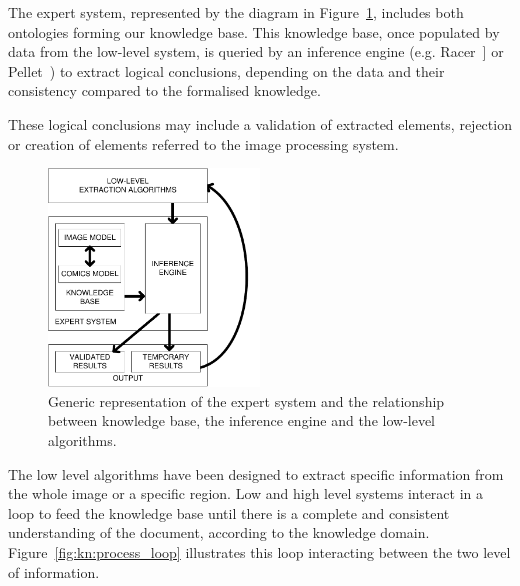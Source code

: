 The expert system, represented by the diagram in Figure~\ref{fig:kn:generic_expert_system}, includes both ontologies forming our knowledge base.
This knowledge base, once populated by data from the low-level system, is queried by an inference engine (e.g. Racer~\cite{Haarslev2012}] or Pellet~\cite{Sirin2007a}) to extract logical conclusions, depending on the data and their consistency compared to the formalised knowledge.

These logical conclusions may include a validation of extracted elements, rejection or creation of elements referred to the image processing system.


 \begin{figure}[!ht]  %
   \centering
  \includegraphics[trim= 0px 0px 0px 0px, clip, width=0.5\textwidth]{expert_system.pdf}
  \caption[Generic representation of the expert system and the relationship between knowledge base, the inference engine and the low-level algorithms]{Generic representation of the expert system and the relationship between knowledge base, the inference engine and the low-level algorithms.}
  \label{fig:kn:generic_expert_system}
 \end{figure}

The low level algorithms have been designed to extract specific information from the whole image or a specific region.
Low and high level systems interact in a loop to feed the knowledge base until there is a complete and consistent understanding of the document, according to the knowledge domain. 
Figure~\ref{fig:kn:process_loop} illustrates this loop interacting between the two level of information.

